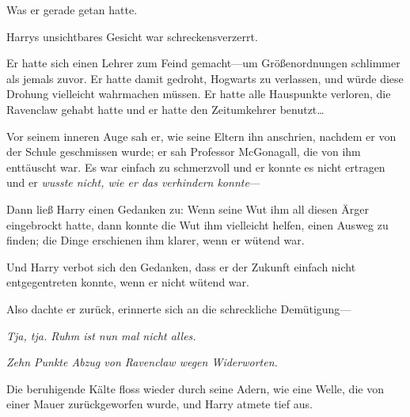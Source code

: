 Was er gerade getan hatte.

Harrys unsichtbares Gesicht war schreckensverzerrt.

Er hatte sich einen Lehrer zum Feind gemacht—um Größenordnungen schlimmer als jemals zuvor. Er hatte damit gedroht, Hogwarts zu verlassen, und würde diese Drohung vielleicht wahrmachen müssen. Er hatte alle Hauspunkte verloren, die Ravenclaw gehabt hatte und er hatte den Zeitumkehrer benutzt…

Vor seinem inneren Auge sah er, wie seine Eltern ihn anschrien, nachdem er von der Schule geschmissen wurde; er sah Professor McGonagall, die von ihm enttäuscht war. Es war einfach zu schmerzvoll und er konnte es nicht ertragen und er \emph{wusste nicht, wie er das verhindern konnte}—

Dann ließ Harry einen Gedanken zu: Wenn seine Wut ihm all diesen Ärger eingebrockt hatte, dann konnte die Wut ihm vielleicht helfen, einen Ausweg zu finden; die Dinge erschienen ihm klarer, wenn er wütend war.

Und Harry verbot sich den Gedanken, dass er der Zukunft einfach nicht entgegentreten konnte, wenn er nicht wütend war.

Also dachte er zurück, erinnerte sich an die schreckliche Demütigung—

\emph{Tja, tja. Ruhm ist nun mal nicht alles.}

\emph{Zehn Punkte Abzug von Ravenclaw wegen Widerworten.}

Die beruhigende Kälte floss wieder durch seine Adern, wie eine Welle, die von einer Mauer zurückgeworfen wurde, und Harry atmete tief aus.

